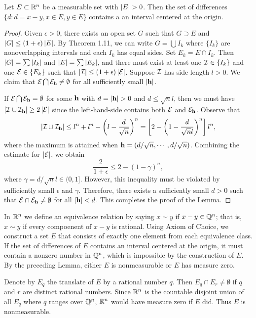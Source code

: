 \begin{lemma}
  Let $E \subset \mathbb{R}^n$ be a measurable set with $\left\vert E\right\vert > 0$.
  Then the set of differences
  $\{d : d = x-y, x \in E, y \in E\}$
  contains a an interval centered at the origin.
\end{lemma}
\begin{proof}
  Given $\epsilon > 0$, there exists an open set $G$
  such that $G \supset E$ and $\left\vert G\right\vert \le (1+\epsilon) \left\vert E\right\vert$.
  By Theorem 1.11, we can write $G = \bigcup I_k$
  where $\{I_k\}$ are nonoverlapping intervals
  and each $I_k$ has equal sides.
  Set $E_k = E \cap I_k$.
  Then $\left\vert G\right\vert = \sum \left\vert I_k\right\vert$ and $\left\vert E\right\vert = \sum \left\vert E_k\right\vert$,
  and there must exist at least one $\mathcal{I} \in \{I_k\}$ and one $\mathcal{E} \in \{E_k\}$
  such that $\left\vert\mathcal{I}\right\vert \le (1+\epsilon) \left\vert\mathcal{E}\right\vert$.
  Suppose $\mathcal{I}$ has side length $l > 0$.
  We claim that $\mathcal{E} \bigcap \mathcal{E}_{\mathbf{h}} \neq \emptyset$
  for all sufficiently small $|\mathbf{h}|$.

  If $\mathcal{E} \bigcap \mathcal{E}_{\mathbf{h}} = \emptyset$ for some $\mathbf{h}$
  with $d = |\mathbf{h}| > 0$ and $d \le \sqrt{n} l$,
  then we must have $\left\vert\mathcal{I} \cup \mathcal{I}_{\mathbf{h}}\right\vert \ge 2 \left\vert\mathcal{E}\right\vert$
  since the left-hand-side contains both $\mathcal{E}$ and $\mathcal{E}_{\mathbf{h}}$.
  Observe that %
  \[
    \left\vert\mathcal{I} \cup \mathcal{I}_{\mathbf{h}}\right\vert \le l^n + l^n - \left( l - \frac{d}{\sqrt{n}} \right)^n
    = \left[ 2 - \left( 1 - \frac{d}{\sqrt{n} l} \right)^n \right] l^n,
  \]
  where the maximum is attained when
  $\mathbf{h} = (d / \sqrt{n}, \cdots, d / \sqrt{n})$.
  Combining the estimate for $\left\vert\mathcal{E}\right\vert$, we obtain
  \[
    \frac{2}{1 + \epsilon} \le  2 - \left( 1 - \gamma \right)^n,
  \]
  where $\gamma = d / \sqrt{n} l \in (0, 1]$.
  However, this inequality must be violated
  by sufficiently small $\epsilon$ and $\gamma$.
  Therefore, there exists a sufficiently small $d > 0$
  such that $\mathcal{E} \cap \mathcal{E}_{\mathbf{h}} \neq \emptyset$
  for all $|\mathbf{h}| < d$.
  This completes the proof of the Lemma.
\end{proof}

\begin{exercise}{3.19}
  In $\mathbb{R}^n$ we define an equivalence relation by saying
  $x \sim y$ if $x - y \in \mathbb{Q}^n$;
  that is, $x \sim y$ if every compoenent of $x-y$ is rational.
  Using Axiom of Choice,
  we construct a set $E$ that consists of exactly one element
  from each equivalence class.
  If the set of differences of $E$ contains an interval centered at the origin,
  it must contain a nonzero number in $\mathbb{Q}^n$,
  which is impossible by the construction of $E$.
  By the preceding Lemma,
  either $E$ is nonmeasurable or $E$ has measure zero.

  Denote by $E_q$ the translate of $E$ by a rational number $q$.
  Then $E_q \cap E_r \neq \emptyset$ if $q$ and $r$ are distinct rational numbers.
  Since $\mathbb{R}^n$ is the countable disjoint union of all $E_q$
  where $q$ ranges over $\mathbb{Q}^n$,
  $\mathbb{R}^n$ would have measure zero if $E$ did.
  Thus $E$ is nonmeasurable.
\end{exercise}

